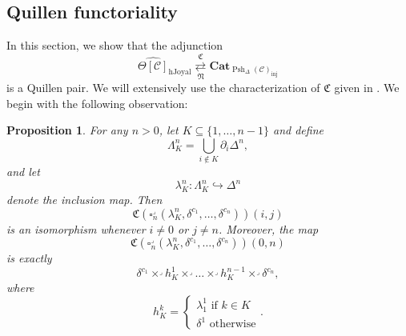 \documentclass[a4paper]{article}
\numberwithin{equation}{subsection}
\theoremstyle{plain}   %
\newtheorem{prop}[equation]{Proposition}
\theoremstyle{definition}
\theoremstyle{remark}
\theoremstyle{plain}
\newcommand{\Cat}{\ensuremath{\mathbf{Cat}}}
\newcommand{\cellset}{\ensuremath{\widehat{\Theta[\mathcal{C}]}}}
\newcommand{\spsh}{\ensuremath{\operatorname{Psh}_\Delta(\mathcal{C})}}
\begin{document}
\subsection{Quillen functoriality}
In this section, we show that the adjunction \[\cellset_{\mathrm{hJoyal}} \underset{\mathfrak{N}}{\overset{\mathfrak{C}}{\rightleftarrows}} \Cat_{\spsh_{\mathrm{inj}}}\] is a Quillen pair. We will extensively use the characterization of \(\mathfrak{C}\) given in .  We begin with the following observation:

\begin{prop}
	For any \(n>0\), let \(K\subseteq \{1,\dots,n-1\}\) and define
	\[\Lambda^n_K=\bigcup_{i\notin K} \partial_i \Delta^n,\]
	and let
	\[\lambda^n_K:\Lambda^n_K\hookrightarrow \Delta^n\]
	denote the inclusion map.  Then
	\[\mathfrak{C}(\square^\lrcorner_n(\lambda^n_K,\delta^{c_1},\dots,\delta^{c_n}))(i,j)\]
	is an isomorphism whenever \(i\neq 0\) or \(j\neq n\).  Moreover, the map
	\[\mathfrak{C}(\square^\lrcorner_n(\lambda^n_K,\delta^{c_1},\dots,\delta^{c_n}))(0,n)\]
	is exactly
	\[\delta^{c_1}\times^\lrcorner h^1_K \times^\lrcorner \dots \times^\lrcorner h^{n-1}_K \times^\lrcorner \delta^{c_n},\]
	where
	\[
		h^k_K =
		\begin{cases}
			\lambda^1_1 \text{ if } k\in K \\
			\delta^1 \text{ otherwise}
		\end{cases}.
	\]
\end{prop}
\end{document}
